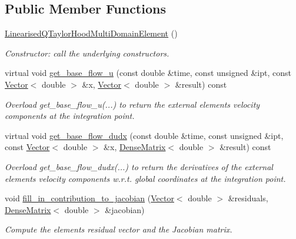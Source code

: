 \subsection*{Public Member Functions}
\begin{DoxyCompactItemize}
\item 
\hyperlink{classLinearisedQTaylorHoodMultiDomainElement_a0aa0d2d9684c13b02ef9fe19bed8dca1}{Linearised\+Q\+Taylor\+Hood\+Multi\+Domain\+Element} ()
\begin{DoxyCompactList}\small\item\em Constructor\+: call the underlying constructors. \end{DoxyCompactList}\item 
virtual void \hyperlink{classLinearisedQTaylorHoodMultiDomainElement_ad441b17104c64206b308779a52cc814e}{get\+\_\+base\+\_\+flow\+\_\+u} (const double \&time, const unsigned \&ipt, const \hyperlink{classoomph_1_1Vector}{Vector}$<$ double $>$ \&x, \hyperlink{classoomph_1_1Vector}{Vector}$<$ double $>$ \&result) const
\begin{DoxyCompactList}\small\item\em Overload get\+\_\+base\+\_\+flow\+\_\+u(...) to return the external element\textquotesingle{}s velocity components at the integration point. \end{DoxyCompactList}\item 
virtual void \hyperlink{classLinearisedQTaylorHoodMultiDomainElement_a6475d80b5a628ad3fbdf8ad2a354617d}{get\+\_\+base\+\_\+flow\+\_\+dudx} (const double \&time, const unsigned \&ipt, const \hyperlink{classoomph_1_1Vector}{Vector}$<$ double $>$ \&x, \hyperlink{classoomph_1_1DenseMatrix}{Dense\+Matrix}$<$ double $>$ \&result) const
\begin{DoxyCompactList}\small\item\em Overload get\+\_\+base\+\_\+flow\+\_\+dudx(...) to return the derivatives of the external element\textquotesingle{}s velocity components w.\+r.\+t. global coordinates at the integration point. \end{DoxyCompactList}\item 
void \hyperlink{classLinearisedQTaylorHoodMultiDomainElement_ae408b0f2829214b7b5d5be7f5d03a604}{fill\+\_\+in\+\_\+contribution\+\_\+to\+\_\+jacobian} (\hyperlink{classoomph_1_1Vector}{Vector}$<$ double $>$ \&residuals, \hyperlink{classoomph_1_1DenseMatrix}{Dense\+Matrix}$<$ double $>$ \&jacobian)
\begin{DoxyCompactList}\small\item\em Compute the element\textquotesingle{}s residual vector and the Jacobian matrix. \end{DoxyCompactList}\end{DoxyCompactItemize}
